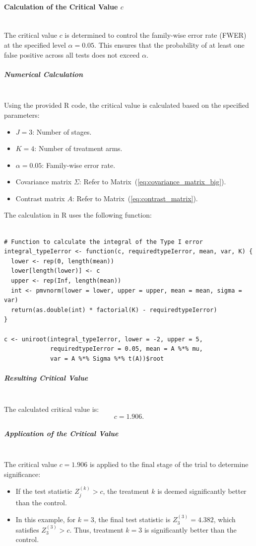 \documentclass[11pt, a4paper]{article}\usepackage[]{graphicx}\usepackage[]{xcolor}
\begin{document}
\paragraph{Calculation of the Critical Value \( c \)}\\

The critical value \( c \) is determined to control the family-wise error rate (FWER) at the specified level \( \alpha = 0.05 \). This ensures that the probability of at least one false positive across all tests does not exceed \( \alpha \).

\subparagraph{Numerical Calculation}\\
Using the provided R code, the critical value is calculated based on the specified parameters:
\begin{itemize}
    \item \( J = 3 \): Number of stages.
    \item \( K = 4 \): Number of treatment arms.
    \item \( \alpha = 0.05 \): Family-wise error rate.
    \item Covariance matrix \( \Sigma \): Refer to Matrix~(\ref{eq:covariance_matrix_big}).
    \item Contrast matrix \( A \): Refer to Matrix~(\ref{eq:contrast_matrix}).
\end{itemize}

The calculation in R uses the following function:

\begin{verbatim}

# Function to calculate the integral of the Type I error
integral_typeIerror <- function(c, requiredtypeIerror, mean, var, K) {
  lower <- rep(0, length(mean))
  lower[length(lower)] <- c
  upper <- rep(Inf, length(mean))
  int <- pmvnorm(lower = lower, upper = upper, mean = mean, sigma = var)
  return(as.double(int) * factorial(K) - requiredtypeIerror)
}

c <- uniroot(integral_typeIerror, lower = -2, upper = 5,
             requiredtypeIerror = 0.05, mean = A %*% mu,
             var = A %*% Sigma %*% t(A))$root
\end{verbatim}

\subparagraph{Resulting Critical Value}\\
The calculated critical value is:
\[
c = 1.906.
\]

\subparagraph{Application of the Critical Value}\\

The critical value \( c = 1.906 \) is applied to the final stage of the trial to determine significance:
\begin{itemize}
    \item If the test statistic \( Z_j^{(k)} > c \), the treatment \( k \) is deemed significantly better than the control.
    \item In this example, for \( k = 3 \), the final test statistic is \( Z_3^{(3)} = 4.382 \), which satisfies \( Z_3^{(3)} > c \). Thus, treatment \( k = 3 \) is significantly better than the control.
\end{itemize}
\end{document}
